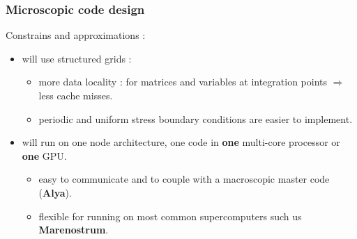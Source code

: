 \documentclass[usenames,dvipsnames]{beamer}
\begin{document}

\begin{frame}
\frametitle{Microscopic code design}

\textcolor{OliveGreen}{Constrains and approximations} :
\begin{itemize}
  \item will use structured grids :
  \begin{itemize}
   \item more data locality : for matrices and variables at integration points $\Rightarrow$ less cache misses.
   \item periodic and uniform stress boundary conditions are easier to implement.
  \end{itemize}
  \item will run on one node architecture, one code in \textbf{one} multi-core processor or \textbf{one} GPU.
  \begin{itemize}
   \item easy to communicate and to couple with a macroscopic master code (\textbf{Alya}).
   \item flexible for running on most common supercomputers such us \textbf{Marenostrum}.
  \end{itemize}

\end{itemize}

\begin{figure}[!ht]
\end{figure}

\end{frame}
\end{document}

